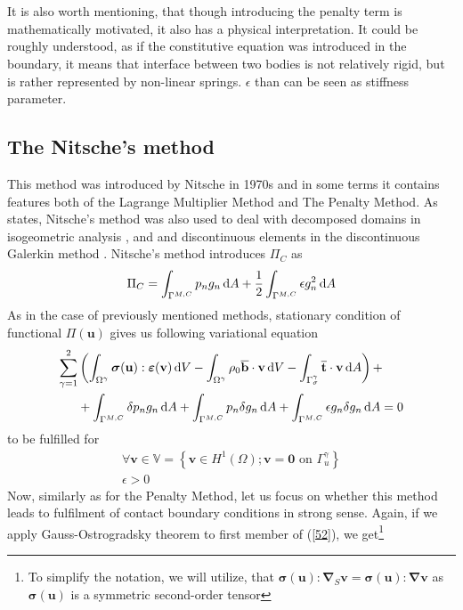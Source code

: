 \documentclass{article}
\newcommand{\beq}{\begin{equation}}
\newcommand{\eeq}{\end{equation}}
\newcommand{\bea}{\begin{eqnarray}}
\newcommand{\eea}{\end{eqnarray}}
\newcommand{\dd}{\,{\rm d}}
\begin{document}
\\
\\
It is also worth mentioning, that though introducing the penalty term is mathematically motivated, it also has a physical interpretation. It could be roughly understood, as if the constitutive equation was introduced in the boundary, it means that interface between two bodies is not relatively rigid, but is rather represented by non-linear springs. $\epsilon$ than can be seen as stiffness parameter.   
\subsection{The Nitsche's method}
This method was introduced by Nitsche in 1970s \cite{Nitsche} and in some terms it contains features both of the Lagrange Multiplier Method and The Penalty Method. As \cite{Augarde} states, Nitsche's method was also used to deal with decomposed domains in isogeometric analysis \cite{Apostolatos}, \cite{Ruess} and and discontinuous elements in the discontinuous Galerkin method \cite{Hansbo}. Nitsche's method introduces $\Pi_{C}$ as 
\beq\label{59}
\Pi_{C} = \int_{\Gamma^{M,C}} p_{n} g_{n}\dd A+\frac{1}{2}\int_{\Gamma^{M,C}} \epsilon g^{2}_{n}\dd A
\eeq   
As in the case of previously mentioned methods, stationary condition of functional $\Pi (\mathbf{u})$ gives us following variational equation
\bea\label{60}
\begin{aligned}
\sum^{2}_{\gamma = 1}&\left(\int_{\Omega^{\gamma}} \bm{\sigma}(\mathbf{u}) : \bm{\varepsilon}(\mathbf{v}) \dd V-\int_{\Omega^{\gamma}} \rho_{0}\overline{\mathbf{b}} \cdot \mathbf{v} \dd V-\int_{\Gamma_{\sigma}^{\gamma}} \overline{\mathbf{t}} \cdot \mathbf{\mathbf{v}} \dd A\right)+
\\
&+\int_{\Gamma^{M,C}} \delta p_{n} g_{n}\dd A+\int_{\Gamma^{M,C}} p_{n} \delta g_{n}\dd A+\int_{\Gamma^{M,C}} \epsilon g_{n} \delta g_{n} \dd A = 0
\end{aligned}
\eea
to be fulfilled for    
\beq\label{61}
\begin{array}{c}
{\forall\mathbf{v}\in {\mathbb{V}=\left\{\mathbf{v} \in H^{1}(\Omega); \mathbf{v}=\mathbf{0} \text { on } \Gamma_{u}^{\gamma}\right\}}}
\\
{\epsilon > 0}
\end{array}
\eeq 
Now, similarly as for the Penalty Method, let us focus on whether this method leads to fulfilment of contact boundary conditions in strong sense. Again, if we apply Gauss-Ostrogradsky theorem to first member of (\ref{52}), we get\footnote{To simplify the notation, we will utilize, that $  \bm{\sigma}(\mathbf{u}) : \bm{\nabla}_{S}\mathbf{v} = \bm{\sigma}(\mathbf{u}) : \bm{\nabla}\mathbf{v} $ as $\bm{\sigma}(\mathbf{u})$ is a symmetric second-order tensor}
\end{document}

